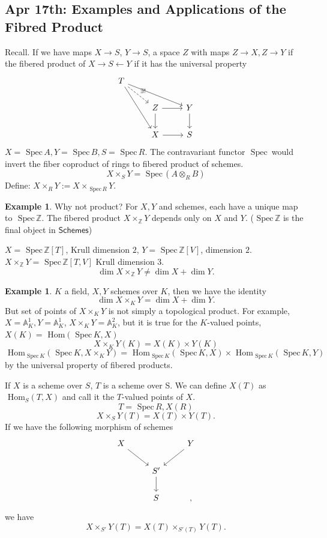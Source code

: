 \documentclass[11pt]{article}
\theoremstyle{definition}
\newtheorem{ex}[thm]{Example}
\renewcommand{\hom}{\text{ Hom}}
\newcommand{\spec}{\text{ Spec}\,}
\newcommand{\affn}{\mathbb A}
\newcommand{\intg}{\mathbb Z}
\newcommand{\lrta}{\longrightarrow}
\begin{document}
\subsection{Apr 17th: Examples and Applications of the Fibred Product}
Recall.
If we have maps
 $X\lrta S$, $Y\lrta S$, a space $Z$ with maps $Z\lrta X, Z\lrta Y$ if the fibered product of $X\lrta S\longleftarrow Y$ if it has the universal property
 $$
\begin{tikzcd}
T \arrow[rdd] \arrow[rrd] \arrow[rd, "\exists!", dashed] &  &  \\
 & Z \arrow[d] \arrow[r] & Y \arrow[d] \\
 & X \arrow[r] & S
\end{tikzcd}
 $$
 $X=\spec A, Y=\spec B, S=\spec R$. The contravariant functor $\spec$ would invert the fiber coproduct of rings to fibered product of schemes.
 $$
X\times_S Y=\spec( A\otimes_R B)
 $$
 Define: $X\times_R Y:=X\times_{\spec R} Y$.

\begin{ex}
Why not product?
For $X,Y$ and schemes, each have a unique map to $\spec \intg$. The fibered product $X\times_\intg Y$ depends only on $X$ and $Y$. ($\spec \intg$ is the final object in $\mathsf{Schemes}$)

$X=\spec \intg[T]$, Krull dimension $2$, $Y=\spec \intg[V]$, dimension $2$. $X\times_\intg Y=\spec \intg[T,V]$ Krull dimension $3$.
$$
\dim X\times_\intg Y\neq \dim X+\dim Y.
$$
\end{ex}

\begin{ex}
$K$ a field, $X, Y$ schemes over $K$, then we have the identity
 $$\dim X\times_K Y=\dim X+\dim Y.$$ But  set of points of $X\times_K Y$ is not simply a topological product. For example, $X=\affn^1_K, Y=\affn^1_K$, $X\times_K Y=\affn^2_K$, but it  is true for the $K$-valued points,  $X(K)=\hom(\spec K, X)$
$$
X\times_K Y(K)=X(K)\times Y(K)
$$
$$
\hom_{\spec K}(\spec K, X\times_K Y)=\hom_{\spec K}(\spec K, X)\times \hom_{\spec K}(\spec K, Y)
$$
by the universal property of fibered products.
\end{ex}

If $X$ is a scheme over $S$, $T$ is a scheme over S. We can define $X(T)$ as $\hom_S(T,X)$
and call it the $T$-valued points of $X$.
$$
T=\spec R, X(R)
$$
$$
X\times_S Y(T)=X(T)\times Y(T).
$$
If we have the following morphism of schemes
$$
\begin{tikzcd}
X \arrow[rd] &  & Y \arrow[ld] \\
 & S' \arrow[d] &  \\
 & S &, 
\end{tikzcd}
$$
 we have 
 $$
X\times_{S'} Y(T)=X(T)\times_{S'(T)} Y(T).
 $$
\end{document}

